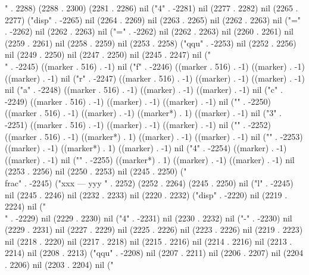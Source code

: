 " . 2288) (2288 . 2300) (2281 . 2286) nil ("4" . -2281) nil (2277 . 2282) nil (2265 . 2277) ("disp" . -2265) nil (2264 . 2269) nil (2263 . 2265) nil (2262 . 2263) nil ("=" . -2262) nil (2262 . 2263) nil ("=" . -2262) nil (2262 . 2263) nil (2260 . 2261) nil (2259 . 2261) nil (2258 . 2259) nil (2253 . 2258) ("qqu" . -2253) nil (2252 . 2256) nil (2249 . 2250) nil (2247 . 2250) nil (2245 . 2247) nil ("\\" . -2245) ((marker . 516) . -1) nil ("f" . -2246) ((marker . 516) . -1) ((marker) . -1) ((marker) . -1) nil ("r" . -2247) ((marker . 516) . -1) ((marker) . -1) ((marker) . -1) nil ("a" . -2248) ((marker . 516) . -1) ((marker) . -1) ((marker) . -1) nil ("c" . -2249) ((marker . 516) . -1) ((marker) . -1) ((marker) . -1) nil ("{" . -2250) ((marker . 516) . -1) ((marker) . -1) ((marker*) . 1) ((marker) . -1) nil ("3" . -2251) ((marker . 516) . -1) ((marker) . -1) ((marker) . -1) nil ("}" . -2252) ((marker . 516) . -1) ((marker*) . 1) ((marker) . -1) ((marker) . -1) nil ("{" . -2253) ((marker) . -1) ((marker*) . 1) ((marker) . -1) nil ("4" . -2254) ((marker) . -1) ((marker) . -1) nil ("}" . -2255) ((marker*) . 1) ((marker) . -1) ((marker) . -1) nil (2253 . 2256) nil (2250 . 2253) nil (2245 . 2250) ("\\frac" . -2245) ("xxx
---
yyy
" . 2252) (2252 . 2264) (2245 . 2250) nil ("l" . -2245) nil (2245 . 2246) nil (2232 . 2233) nil (2220 . 2232) ("disp" . -2220) nil (2219 . 2224) nil ("\\" . -2229) nil (2229 . 2230) nil ("4" . -2231) nil (2230 . 2232) nil ("-" . -2230) nil (2229 . 2231) nil (2227 . 2229) nil (2225 . 2226) nil (2223 . 2226) nil (2219 . 2223) nil (2218 . 2220) nil (2217 . 2218) nil (2215 . 2216) nil (2214 . 2216) nil (2213 . 2214) nil (2208 . 2213) ("qqu" . -2208) nil (2207 . 2211) nil (2206 . 2207) nil (2204 . 2206) nil (2203 . 2204) nil ("
